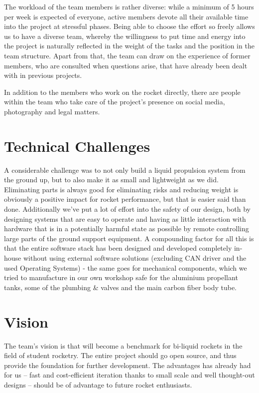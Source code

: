 The workload of the team members is rather diverse: while a minimum of 5 hours per week is expected of everyone, active members devote all their available time into the project at stressful phases. Being able to choose the effort so freely allows us to have a diverse team, whereby the willingness to put time and energy into the project is naturally reflected in the weight of the tasks and the position in the team structure.
Apart from that, the team can draw on the experience of former members, who are consulted when questions arise, that have already been dealt with in previous projects.

In addition to the members who work on the rocket directly, there are people within the team who take care of the project's presence on social media, photography and legal matters.

\section{Technical Challenges}
A considerable challenge was to not only build a liquid propulsion system from the ground up, but to also make it as small and lightweight as we did. Eliminating parts is always good for eliminating risks and reducing weight is obviously a positive impact for rocket performance, but that is easier said than done. Additionally we've put a lot of effort into the safety of our design, both by designing systems that are easy to operate and having as little interaction with hardware that is in a potentially harmful state as possible by remote controlling large parts of the ground support equipment.
A compounding factor for all this is that the entire software stack has been designed and developed completely in-house without using external software solutions (excluding CAN driver and the used Operating Systems) - the same goes for mechanical components, which we tried to manufacture in our own workshop safe for the aluminium propellant tanks, some of the plumbing \& valves and the main carbon fiber body tube.

\section{Vision} %
The team's vision is that \uH will become a benchmark for bi-liquid rockets in the field of student rocketry. The entire project should go open source, and thus provide the foundation for further development. The advantages \uH has already had for us -- fast and cost-efficient iteration thanks to small scale and well thought-out designs -- should be of advantage to future rocket enthusiasts.
